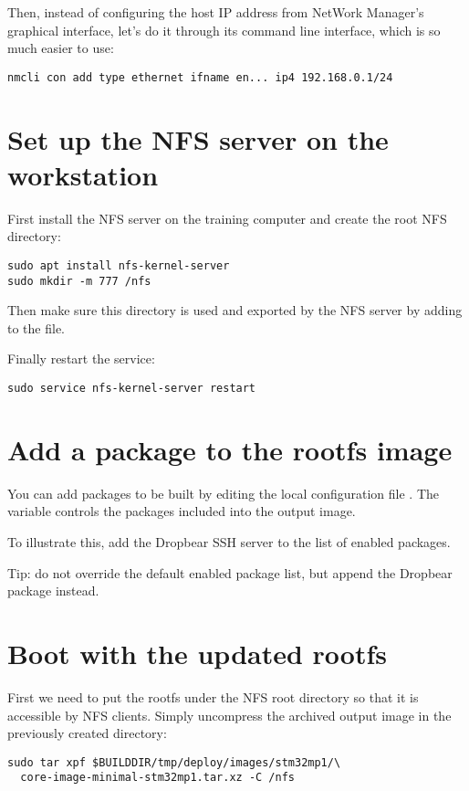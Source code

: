 Then, instead of configuring the host IP address from NetWork Manager’s graphical interface,
let’s do it through its command line interface, which is so much easier to use:

\begin{verbatim}
nmcli con add type ethernet ifname en... ip4 192.168.0.1/24
\end{verbatim}

\section{Set up the NFS server on the workstation}

First install the NFS server on the training computer and create the root NFS
directory:
\begin{verbatim}
sudo apt install nfs-kernel-server
sudo mkdir -m 777 /nfs
\end{verbatim}

Then make sure this directory is used and exported by the NFS server by adding
 to the
 file.

Finally restart the service:
\begin{verbatim}
sudo service nfs-kernel-server restart
\end{verbatim}

\section{Add a package to the rootfs image}

You can add packages to be built by editing the local configuration file
. The  variable controls the
packages included into the output image.

To illustrate this, add the Dropbear SSH server to the list of enabled
packages.

Tip: do not override the default enabled package list, but append the Dropbear
package instead.

\section{Boot with the updated rootfs}

First we need to put the rootfs under the NFS root directory so that it is
accessible by NFS clients. Simply uncompress the archived output image in the
previously created  directory:
\begin{verbatim}
sudo tar xpf $BUILDDIR/tmp/deploy/images/stm32mp1/\
  core-image-minimal-stm32mp1.tar.xz -C /nfs
\end{verbatim}

